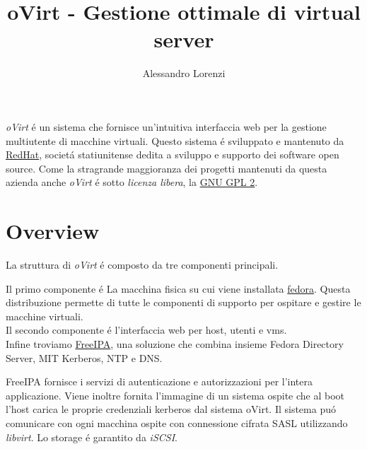 \documentclass[a4paper,10pt]{article}
\title{oVirt - Gestione ottimale di virtual server}
\author{Alessandro Lorenzi}
\begin{document}
\maketitle

\textit{oVirt} é un sistema che fornisce un'intuitiva interfaccia web per la gestione multiutente
di macchine virtuali. Questo sistema é sviluppato e mantenuto da \href{www.it.redhat.com}{RedHat},
societá statiunitense dedita a sviluppo e supporto dei software open source. Come la stragrande
maggioranza dei progetti mantenuti da questa azienda anche \textit{oVirt}
é sotto \textit{licenza libera}, la \href{http://www.gnu.org/licenses/gpl-2.0.html}{GNU GPL 2}.

\section{Overview}
La struttura di \textit{oVirt} é composto da tre componenti principali.

Il primo componente é La macchina fisica su cui viene installata \href{http://fedoraproject.org}{fedora}.
Questa distribuzione permette di tutte le componenti di supporto per ospitare e gestire le macchine virtuali.\\
Il secondo componente é l'interfaccia web per host, utenti e vms.\\
Infine troviamo \href{http://freeipa.org/}{FreeIPA}, una soluzione che combina insieme Fedora Directory Server,
MIT Kerberos, NTP e DNS.

FreeIPA fornisce i servizi di autenticazione e autorizzazioni per l'intera applicazione. Viene inoltre fornita
l'immagine di un sistema ospite che al boot l'host carica le proprie credenziali kerberos dal sistema oVirt. 
Il sistema puó comunicare con ogni macchina ospite con connessione cifrata SASL utilizzando \textit{libvirt}.
Lo storage é garantito da \textit{iSCSI}.
\end{document}
